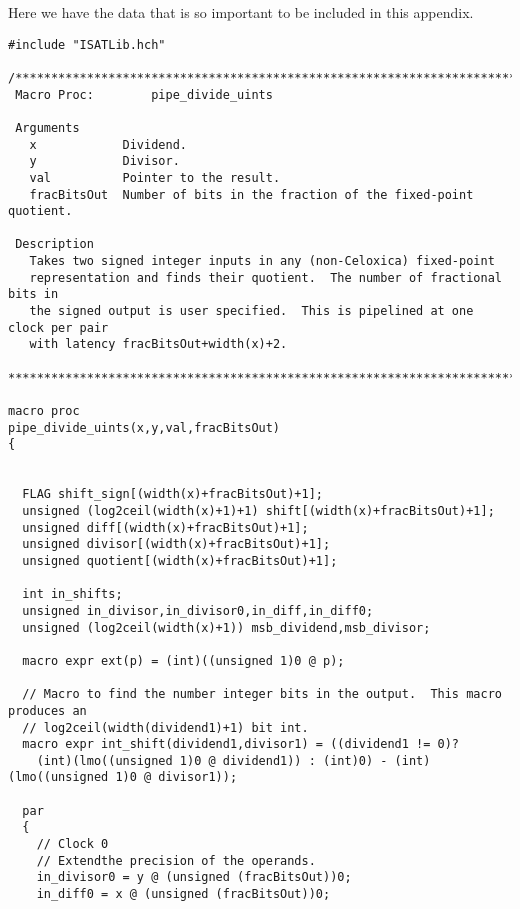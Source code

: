 \label{sec:meat}

Here we have the data that is so important to be included in this
appendix.


\lstset{
basicstyle=\small\ttfamily,
columns=flexible,
breaklines=true
}

\begin{lstlisting}
#include "ISATLib.hch"

/*****************************************************************************
 Macro Proc:		pipe_divide_uints                                    
                                                               
 Arguments
   x			Dividend.
   y			Divisor.
   val			Pointer to the result.
   fracBitsOut	Number of bits in the fraction of the fixed-point quotient.
                                                              
 Description 
   Takes two signed integer inputs in any (non-Celoxica) fixed-point
   representation and finds their quotient.  The number of fractional bits in
   the signed output is user specified.  This is pipelined at one clock per pair
   with latency fracBitsOut+width(x)+2.
                      
******************************************************************************/

macro proc
pipe_divide_uints(x,y,val,fracBitsOut)
{


  FLAG shift_sign[(width(x)+fracBitsOut)+1];
  unsigned (log2ceil(width(x)+1)+1) shift[(width(x)+fracBitsOut)+1];
  unsigned diff[(width(x)+fracBitsOut)+1];
  unsigned divisor[(width(x)+fracBitsOut)+1];
  unsigned quotient[(width(x)+fracBitsOut)+1];

  int in_shifts;
  unsigned in_divisor,in_divisor0,in_diff,in_diff0;
  unsigned (log2ceil(width(x)+1)) msb_dividend,msb_divisor;

  macro expr ext(p) = (int)((unsigned 1)0 @ p);

  // Macro to find the number integer bits in the output.  This macro produces an
  // log2ceil(width(dividend1)+1) bit int.
  macro expr int_shift(dividend1,divisor1) = ((dividend1 != 0)?
    (int)(lmo((unsigned 1)0 @ dividend1)) : (int)0) - (int)(lmo((unsigned 1)0 @ divisor1));

  par
  {
    // Clock 0
    // Extendthe precision of the operands.
    in_divisor0 = y @ (unsigned (fracBitsOut))0;
    in_diff0 = x @ (unsigned (fracBitsOut))0;


\end{lstlisting}

